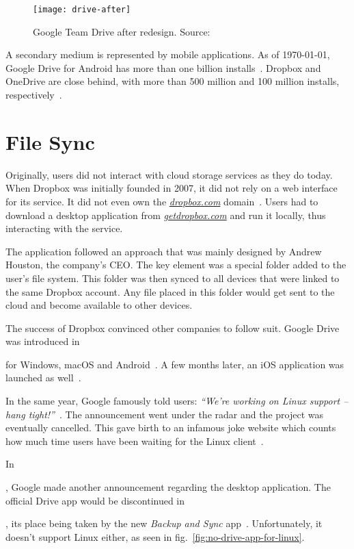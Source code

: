 \begin{figure}[bpt]
\caption{Google Team Drive after redesign. Source:~\cite{google_drive_ui_updates}}
\label{fig:drive-after}
\centering
\texttt{[image: drive-after]}
\end{figure}


A secondary medium is represented by mobile applications. As of \monthyeardate\today, Google Drive for Android has more than one billion installs~\cite{google_drive_android_app}. Dropbox and OneDrive are close behind, with more than 500 million and 100 million installs, respectively~\cite{dropbox_android_app,one_drive_android_app}.

\section{File Sync}

Originally, users did not interact with cloud storage services as they do today. When Dropbox was initially founded in 2007, it did not rely on a web interface for its service. It did not even own the \emph{\url{dropbox.com}} domain~\cite{dropbox_acquires_dropbox_dot_com}. Users had to download a desktop application from \emph{\url{getdropbox.com}} and run it locally, thus interacting with the service.

The application followed an approach that was mainly designed by Andrew Houston, the company's CEO. The key element was a special folder added to the user's file system. This folder was then synced to all devices that were linked to the same Dropbox account. Any file placed in this folder would get sent to the cloud and become available to other devices.

The success of Dropbox convinced other companies to follow suit. Google Drive was introduced in \date{April 2012} for Windows, macOS and Android~\cite{introducing_google_drive}. A few months later, an iOS application was launched as well~\cite{hands_on_with_the_google_drive_for_ios_app}.

In the same year, Google famously told users: \emph{``We're working on Linux support -- hang tight!''}~\cite{google_drive_for_linux_is_on_the_way}. The announcement went under the radar and the project was eventually cancelled. This gave birth to an infamous joke website which counts how much time users have been waiting for the Linux client~\cite{how_long_since_google_said_hang_tight}.

In \date{September 2017}, Google made another announcement regarding the desktop application. The official Drive app would be discontinued in \date{March 2018}, its place being taken by the new \emph{Backup and Sync} app~\cite{introducing_backup_and_sync,google_drive_is_being_replaced_by_backup_and_sync}. Unfortunately, it doesn't support Linux either, as seen in fig.~\ref{fig:no-drive-app-for-linux}.

